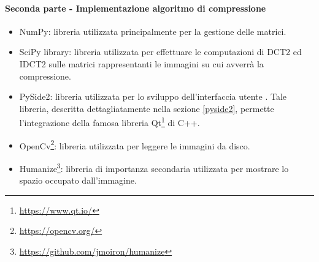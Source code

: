 \paragraph{Seconda parte - Implementazione algoritmo di compressione}
\begin{itemize}
    \item NumPy: libreria utilizzata principalmente per la gestione delle matrici.
    \item SciPy library: libreria utilizzata per effettuare le computazioni di DCT2 ed IDCT2 sulle matrici rappresentanti le immagini su cui avverrà la compressione.
    \item PySide2: libreria utilizzata per lo sviluppo dell'interfaccia utente \cite{Qt_for_Python:1}. Tale libreria, descritta dettagliatamente nella sezione \ref{pyside2}, permette l'integrazione della famosa libreria Qt\footnote{\url{https://www.qt.io/}} di C++.
    \item OpenCv\footnote{\url{https://opencv.org/}}: libreria utilizzata per leggere le immagini da disco.
    \item Humanize\footnote{\url{https://github.com/jmoiron/humanize}}: libreria di importanza secondaria utilizzata per mostrare lo spazio occupato dall'immagine.
\end{itemize}